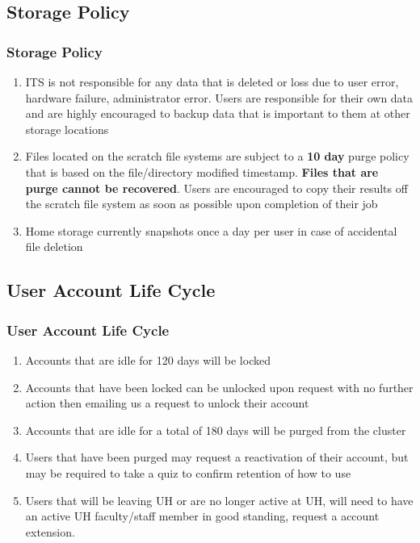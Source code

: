 \subsection{Storage Policy}
\begin{frame}
\frametitle{Storage Policy}
\begin{enumerate}
\item ITS is not responsible for any data that is deleted or loss due to user error, hardware failure, administrator error.  Users are responsible for their own data and are highly encouraged to backup data that is important to them at other storage locations
\item Files located on the scratch file systems are subject to a \textbf{10 day} purge policy that is based on the file/directory modified timestamp.  \textbf{Files that are purge cannot be recovered}.  Users are encouraged to copy their results off the scratch file system as soon as possible upon completion of their job
\item  Home storage currently snapshots once a day per user in case of accidental file deletion
\end{enumerate}
\end{frame}


\subsection{User Account Life Cycle}
\begin{frame}
\frametitle{User Account Life Cycle}
\begin{enumerate}
\item Accounts that are idle for 120 days will be locked
\item Accounts that have been locked can be unlocked upon request with no further action then emailing us a request to unlock their account
\item Accounts that are idle for a total of 180 days will be purged from the cluster
\item Users that have been purged may request a reactivation of their account, but may be required to take a quiz to confirm retention of how to use {\mana}
\item Users that will be leaving UH or are no longer active at UH, will need to have an active UH faculty/staff member in good standing, request a {\mana} account extension.
\end{enumerate}
\end{frame}


